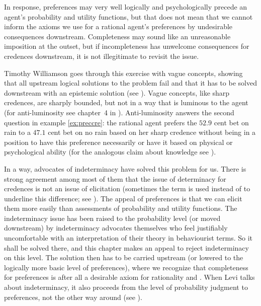 \documentclass[phd,12pt,oneside]{ubcthesis}
\begin{document}
In response, preferences may very well logically and psychologically
precede an agent's probability and utility functions, but that does
not mean that we cannot inform the axioms we use for a rational
agent's preferences by undesirable consequences downstream.
Completeness may sound like an unreasonable imposition at the outset,
but if incompleteness has unwelcome consequences for credences
downstream, it is not illegitimate to revisit the issue. 

Timothy Williamson goes through this exercise with vague concepts,
showing that all upstream logical solutions to the problem fail and
that it has to be solved downstream with an epistemic solution (see
). Vague concepts, like sharp credences, are
sharply bounded, but not in a way that is luminous to the agent (for
anti-luminosity see chapter~4 in ).
Anti-luminosity answers the second question in example
\ref{ex:preccre}: the rational agent prefers the $52.9$ cent bet on
rain to a $47.1$ cent bet on no rain based on her sharp credence
without being in a position to have this preference necessarily or
have it based on physical or psychological ability (for the analogous
claim about knowledge see ).

In a way, advocates of indeterminacy have solved this problem for us.
There is strong agreement among most of them that the issue of
determinacy for credences is not an issue of elicitation (sometimes
the term  is used instead of 
to underline this difference; see ). The appeal
of preferences is that we can elicit them more easily than assessments
of probability and utility functions. The indeterminacy issue has been
raised to the probability level (or moved downstream) by indeterminacy
advocates themselves who feel justifiably uncomfortable with an
interpretation of their theory in behaviourist terms. So it shall be
solved there, and this chapter makes an appeal to reject indeterminacy
on this level. The solution then has to be carried upstream (or
lowered to the logically more basic level of preferences), where we
recognize that completeness for preferences is after all a desirable
axiom for rationality and  . When Levi talks
about indeterminacy, it also proceeds from the level of probability
judgment to preferences, not the other way around (see
).
\end{document}
